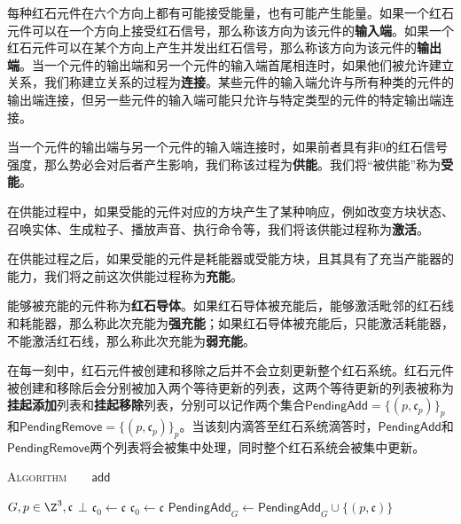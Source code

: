 \documentclass[a4,11pt]{aleph-notas}
\begin{document}
每种红石元件在六个方向上都有可能接受能量，也有可能产生能量。如果一个红石元件可以在一个方向上接受红石信号，那么称该方向为该元件的\textbf{输入端}。如果一个红石元件可以在某个方向上产生并发出红石信号，那么称该方向为该元件的\textbf{输出端}。当一个元件的输出端和另一个元件的输入端首尾相连时，如果他们被允许建立关系，我们称建立关系的过程为\textbf{连接}。某些元件的输入端允许与所有种类的元件的输出端连接，但另一些元件的输入端可能只允许与特定类型的元件的特定输出端连接。

\begin{defi}[供能 powering]
    当一个元件的输出端与另一个元件的输入端连接时，如果前者具有非$0$的红石信号强度，那么势必会对后者产生影响，我们称该过程为\textbf{供能}。我们将“被供能”称为\textbf{受能}。
\end{defi}

\begin{defi}[激活 activating]
    在供能过程中，如果受能的元件对应的方块产生了某种响应，例如改变方块状态、召唤实体、生成粒子、播放声音、执行命令等，我们将该供能过程称为\textbf{激活}。
\end{defi}

\begin{defi}[充能 charging]
    在供能过程之后，如果受能的元件是耗能器或受能方块，且其具有了充当产能器的能力，我们将之前这次供能过程称为\textbf{充能}。
\end{defi}

能够被充能的元件称为\textbf{红石导体}。如果红石导体被充能后，能够激活毗邻的红石线和耗能器，那么称此次充能为\textbf{强充能}；如果红石导体被充能后，只能激活耗能器，不能激活红石线，那么称此次充能为\textbf{弱充能}。

在每一刻中，红石元件被创建和移除之后并不会立刻更新整个红石系统。红石元件被创建和移除后会分别被加入两个等待更新的列表，这两个等待更新的列表被称为\textbf{挂起添加}列表和\textbf{挂起移除}列表，分别可以记作两个集合$\textsf{PendingAdd}=\{(p,\mathfrak{c}_p)\}_p$和$\textsf{PendingRemove}=\{(p,\mathfrak{c}_p)\}_p$。当该刻内滴答至红石系统滴答时，$\textsf{PendingAdd}$和$\textsf{PendingRemove}$两个列表将会被集中处理，同时整个红石系统会被集中更新。

\begin{codigo}
\textsc{Algorithm}\ \ \ \ $\mathsf{add}$
\begin{algorithmic}[1]
    \Require $G,p\in\Z^3,\mathfrak{c}$
    \Ensure $\bot$
                \State $\mathfrak{c}_0\gets\mathfrak{c}$
            \EndIf
            \State \Return
                \State $\mathfrak{c}_0\gets\mathfrak{c}$
            \EndIf
            \State \Return
        \EndIf
    \EndIf
    \State $\textsf{PendingAdd}_G\gets\textsf{PendingAdd}_G\cup\{(p,\mathfrak{c})\}$
    \State \Return
\end{algorithmic}
\end{codigo}
\end{document}
